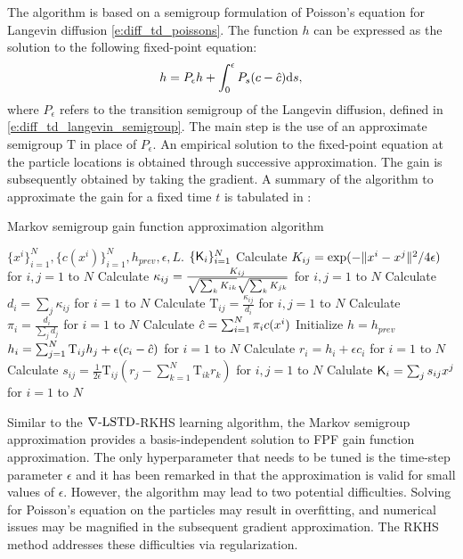 The algorithm is based on a semigroup formulation of Poisson's equation for Langevin diffusion \eqref{e:diff_td_poissons}. The function $h$ can be expressed as the solution to the following fixed-point equation:
\begin{equation}
h = P_\epsilon h + \int_0^\epsilon P_s (c - {\hat c}) \text{d} s,
\end{equation}
where $P_\epsilon$ refers to the transition semigroup of the Langevin diffusion, defined in \eqref{e:diff_td_langevin_semigroup}. The main step is the use of an approximate semigroup $\text{T}$ in place of $P_\epsilon$.
An empirical solution to the fixed-point equation at the particle locations is obtained through successive approximation. The gain is subsequently obtained by taking the gradient.  A summary of the algorithm to approximate the gain for a fixed time $t$ is tabulated in :
\begin{algorithm}{Markov semigroup gain function approximation algorithm}
\begin{algorithmic}[1]
	\Require $\{x^i\}_{i=1}^N, \{c(x^i)\}_{i=1}^N, h_{prev}, \epsilon, L$.
	\Ensure $\{\text{\sf K}_i\}_{i=1}^N$
	\State Calculate $K_{ij} = \exp(-\|x^i - x^j\|^2/ 4\epsilon)$ for $i,j = 1$ to $N$  
	\State Calculate $\kappa_{ij} = \frac{K_{ij}}{\sqrt{\sum_k K_{ik}}\sqrt{\sum_k K_{jk}}}$ for $i,j =1$ to $N$
	\State Calculate $d_i = \sum_j \kappa_{ij}$ for $i=1$ to $N$
	\State Calculate $\text{T}_{ij} = \frac{\kappa_{ij}}{d_i}$ for $i,j = 1$ to $N$ 
	\State Calculate $\pi_i = \frac{d_i}{\sum_j d_j}$ for $i=1$ to $N$
	\State Calculate $ {\hat c} = \sum_{i = 1}^N \pi_i c(x^i)$
	\State Initialize $h =h_{prev}$
		 \State $h_i = \sum_{j=1}^N \text{T}_{ij} h_j + \epsilon (c_i - {\hat c})$ for $i=1$ to $N$ 
		\EndFor
	\State Calculate $r_i = h_i + \epsilon c_i$ for $i=1$ to $N$
	\State Calculate $s_{ij} = \frac{1}{2\epsilon} \text{T}_{ij} (r_j - \sum_{k=1}^N \text{T}_{ik} r_k)$ for $i,j=1$ to $N$ 
	\State Calulate $\text{\sf K}_i  = \sum_j s_{ij} x^j$ for $i =1$ to $N$ 
	\label{alg:coifman}
\end{algorithmic}
\end{algorithm}

Similar to the $\nabla\text{-LSTD}$-RKHS learning algorithm, the Markov semigroup approximation provides a basis-independent solution to FPF gain function approximation. The only hyperparameter that needs to be tuned is the time-step parameter $\epsilon$ and it has been remarked in \cite{tagmeh16} that the approximation is valid for small values of $\epsilon$. However, the algorithm may lead to two potential difficulties. Solving for Poisson's equation on the particles may result in overfitting,  and numerical issues may be magnified in the subsequent gradient approximation. The RKHS method addresses these difficulties via regularization. 

